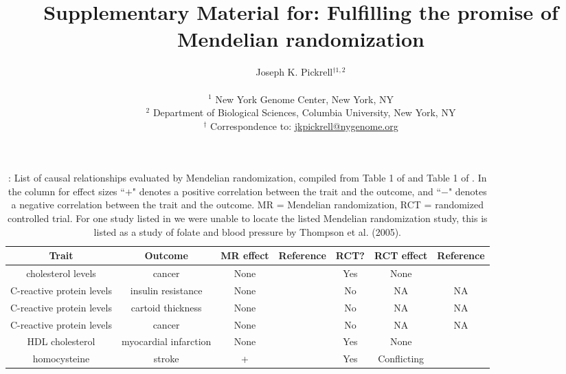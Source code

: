 \documentclass[11pt,titlepage]{article}
\begin{document}
\title{Supplementary Material for: Fulfilling the promise of Mendelian randomization}
\author{Joseph K. Pickrell$^{\dagger 1,2}$\\ \\
\small $^1$ New York Genome Center, New York, NY\\
\small $^2$ Department of Biological Sciences, Columbia University, New York, NY \\
\small $^\dagger$ Correspondence to: \url{jkpickrell@nygenome.org}
}
\maketitle
\clearpage


\begin{table}[htdp]
\caption{: List of causal relationships evaluated by Mendelian randomization, compiled from Table 1 of \citet{Davey-Smith:2014aa} and Table 1 of \citet{burgess2015mendelian}. In the column for effect sizes ``$+$" denotes a positive correlation between the trait and the outcome, and ``$-$" denotes a negative correlation between the trait and the outcome. MR = Mendelian randomization, RCT = randomized controlled trial. For one study listed in \citet{burgess2015mendelian} we were unable to locate the listed Mendelian randomization study, this is listed as a study of folate and blood pressure by Thompson et al. (2005).}
\begin{center}
\begin{footnotesize}
\tabcolsep=0.11cm
\begin{tabular}{|c|c|c|c|c|c|c|}
\hline
Trait & Outcome & MR effect & Reference & RCT? & RCT effect & Reference\\
\hline
cholesterol levels & cancer & None & \cite{Trompet:2009aa} & Yes & None & \cite{Dale:2006aa}\\
C-reactive protein levels & insulin resistance & None & \cite{Timpson:2005aa} & No &NA & NA\\
C-reactive protein levels & cartoid thickness  & None & \cite{Kivimaki:2008aa} & No & NA & NA\\
C-reactive protein levels & cancer & None & \cite{Allin:2010aa} & No &NA & NA\\
HDL cholesterol & myocardial infarction & None & \cite{Voight:2012aa} & Yes & None & \cite{Barter:2007aa} \\
homocysteine & stroke & + &  \cite{Casas:2005aa} & Yes & Conflicting & \cite{Huo:2015aa, Study-of-the-Effectiveness-of-Additional-Reductions-in-Cholesterol-and-Homocysteine-SEARCH-Collaborative-Group:2010aa} \\

\end{tabular}
\end{footnotesize}
\end{center}
\end{table}
\end{document}
